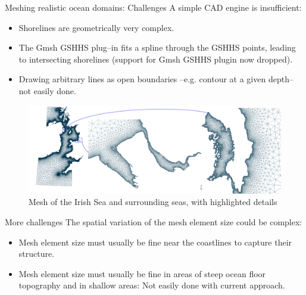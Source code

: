 \documentclass[t]{beamer}
\begin{document}
\begin{frame}{Meshing realistic ocean domains: Challenges}
A simple CAD engine is insufficient:
\begin{itemize}
   \item Shorelines are geometrically very complex.
   \item The Gmsh GSHHS plug--in fits a spline through the GSHHS points, leading to intersecting shorelines (support for Gmsh GSHHS plugin now dropped).
   \item Drawing arbitrary lines as open boundaries --e.g. contour at a given depth-- not easily done.
\end{itemize}
\begin{figure}[htbp]
 \centering
  \includegraphics[width=1.00\textwidth]{../figures/UKwc_mesh_with_details/UK_west_coast_with_details}
  \caption{Mesh of the Irish Sea and surrounding seas, with highlighted details}
  \label{fig:IrishSeaMesh}
\end{figure}
\end{frame}

\begin{frame}{More challenges}
The spatial variation of the mesh element size could be complex:
\begin{itemize}
   \item Mesh element size must usually be fine near the coastlines to capture their structure.\\[15pt]
   \item Mesh element size must usually be fine in areas of steep ocean floor topography and in shallow areas: Not easily done with current approach.
\end{itemize}
\end{frame}
\end{document}
